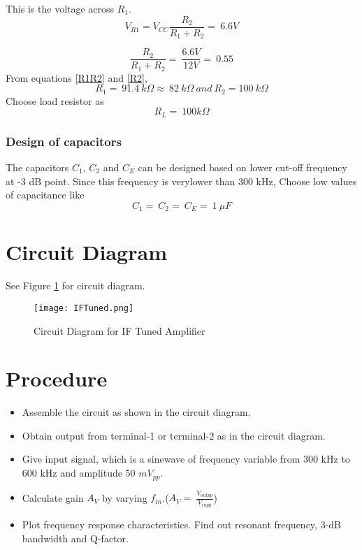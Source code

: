 \noindent This is the voltage across $R_1$. 
\begin{equation}
V_{R1}= V_{CC} \frac{R_2}{R_1+R_2}=\ 6.6V
\end{equation}

\begin{equation}
\label{R2}
\frac{R_2}{R_1+R_2}=\ \frac{6.6V}{12V}=\ 0.55
\end{equation}
From equations \ref{R1R2} and \ref{R2}, 
\begin{equation}
R_1=\ 91.4\ k\Omega \approx \ 82\ k\Omega \ and \ R_2=100\ k\Omega
\end{equation}
\noindent Choose load resistor as 
\begin{equation}
R_L=\ 100 k\Omega
\end{equation}
\subsubsection{Design of capacitors}
\noindent The capacitors $C_1$, $C_2$  and $C_E$  can be designed based on lower cut-off frequency at -3 dB point. Since this frequency is verylower than 300 kHz, Choose low values of capacitance like \begin{equation}
C_1=\ C_2=\ C_E=\ 1 \ \mu F
\end{equation}

\section*{Circuit Diagram}
See Figure \ref{IFTuned} for circuit diagram.
\begin{figure}[ht]
\texttt{[image: IFTuned.png]}
\caption{Circuit Diagram for IF Tuned Amplifier}
\label{IFTuned}
\end{figure}
\section*{Procedure}
\begin{itemize}
\item
Assemble the circuit as shown in the circuit diagram.
\item
Obtain output from terminal-1 or terminal-2 as in the circuit diagram.
\item
Give input signal, which is a sinewave of frequency variable from 300 kHz to 600 kHz and amplitude 50 $mV_{pp}$.
\item
Calculate gain $A_V$ by varying $f_{in}$.($A_V= \ \frac{V_{outpp}}{V_{inpp}}$)

\item
Plot frequency response characteristics. Find out resonant frequency, 3-dB bandwidth and Q-factor.
\end{itemize}
